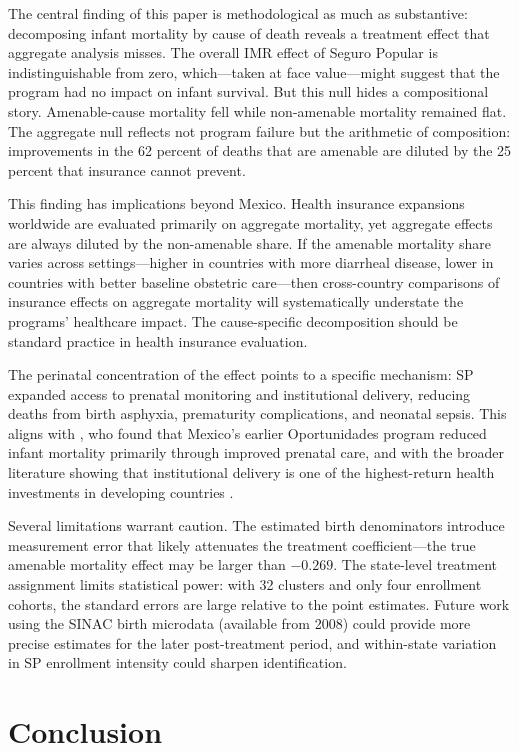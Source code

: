 \documentclass[12pt]{article}
\begin{document}
The central finding of this paper is methodological as much as substantive: decomposing infant mortality by cause of death reveals a treatment effect that aggregate analysis misses. The overall IMR effect of Seguro Popular is indistinguishable from zero, which---taken at face value---might suggest that the program had no impact on infant survival. But this null hides a compositional story. Amenable-cause mortality fell while non-amenable mortality remained flat. The aggregate null reflects not program failure but the arithmetic of composition: improvements in the 62 percent of deaths that are amenable are diluted by the 25 percent that insurance cannot prevent.

This finding has implications beyond Mexico. Health insurance expansions worldwide are evaluated primarily on aggregate mortality, yet aggregate effects are always diluted by the non-amenable share. If the amenable mortality share varies across settings---higher in countries with more diarrheal disease, lower in countries with better baseline obstetric care---then cross-country comparisons of insurance effects on aggregate mortality will systematically understate the programs' healthcare impact. The cause-specific decomposition should be standard practice in health insurance evaluation.

The perinatal concentration of the effect points to a specific mechanism: SP expanded access to prenatal monitoring and institutional delivery, reducing deaths from birth asphyxia, prematurity complications, and neonatal sepsis. This aligns with \citet{barham2011}, who found that Mexico's earlier Oportunidades program reduced infant mortality primarily through improved prenatal care, and with the broader literature showing that institutional delivery is one of the highest-return health investments in developing countries \citep{bhutta2014}.

Several limitations warrant caution. The estimated birth denominators introduce measurement error that likely attenuates the treatment coefficient---the true amenable mortality effect may be larger than $-0.269$. The state-level treatment assignment limits statistical power: with 32 clusters and only four enrollment cohorts, the standard errors are large relative to the point estimates. Future work using the SINAC birth microdata (available from 2008) could provide more precise estimates for the later post-treatment period, and within-state variation in SP enrollment intensity could sharpen identification.

\section{Conclusion}
\end{document}
